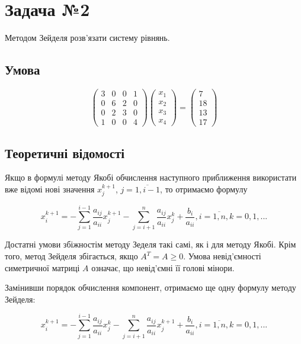 \documentclass[a4paper, 12pt]{article}
\begin{document}
\newpage
\section{Задача №2}

Методом Зейделя розв’язати систему рівнянь.

\subsection{Умова}

\[
\begin{pmatrix}
3 & 0 & 0 & 1 \\
0 & 6 & 2 & 0 \\
0 & 2 & 3 & 0 \\
1 & 0 & 0 & 4
\end{pmatrix}
\begin{pmatrix}
x_1 \\
x_2 \\
x_3 \\
x_4 
\end{pmatrix}
=
\begin{pmatrix}
7 \\
18 \\
13 \\
17 
\end{pmatrix}
\]

\subsection{Теоретичні відомості}

Якщо в формулі методу Якобі обчислення наступного приближення використати вже відомі нові значення $x_j^{k+1}$, $j=\overline{1, i-1}$, то отримаємо формулу

\[
x_{i}^{k+1} = - \sum_{j=1}^{i-1} \frac{a_{ij}}{a_{ii}}x_j^{k+1} - \sum_{j=i+1}^{n} \frac{a_{ij}}{a_{ii}}x_j^k + \frac{b_i}{a_{ii}}, i = \overline{1, n}, k = 0, 1, ...
\]

Достатні умови збіжностім методу Зеделя такі самі, як і для методу Якобі. Крім того, метод Зейделя збігається, якщо $A^T = A \geq 0$. Умова невід'ємності симетричної матриці $A$ означає, що невід'ємні її голові мінори.

Замінивши порядок обчислення компонент, отримаємо ще одну формулу методу Зейделя:

\[
x_{i}^{k+1} = - \sum_{j=1}^{i-1} \frac{a_{ij}}{a_{ii}}x_j^{k} - \sum_{j=i+1}^{n} \frac{a_{ij}}{a_{ii}}x_j^{k+1} + \frac{b_i}{a_{ii}}, i = \overline{1, n}, k = 0, 1, ...
\]
\end{document}
